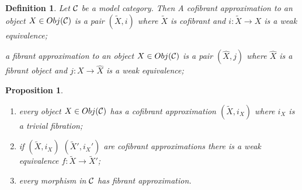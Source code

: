 \documentclass[11pt]{article}
\newtheorem{prop}[thm]{Proposition}
\newtheorem{dfn}[thm]{Definition}
\newcommand{\calc}{{\cal C}}
\newcommand{\lrta}{\longrightarrow}
\begin{document}
\begin{dfn}
Let $\calc$ be a model category. Then A cofibrant approximation to an object $X\in Obj(\calc)$ is a pair $(\tilde{X},i)$ where $\tilde{X}$ is cofibrant and $i:\tilde{X}\lrta X$ is a weak equivalence;

a fibrant approximation to an object $X\in Obj(\calc)$ is a pair $(\hat{X},j)$ where $\hat{X}$ is a fibrant object and $j: X\lrta \hat{X}$ is a weak equivalence;
\end{dfn}

\begin{prop}
\begin{enumerate}[label=(\roman*)]
\item every object $X\in Obj(\calc)$ has a cofibrant approximation $(\tilde{X},i_X)$ where $i_X$ is a trivial fibration;
\item if $(\tilde{X},i_X)$ $(\tilde{X}',i_X
')$ are cofibrant approximations there is a weak equivalence $f:\tilde{X}\lrta \tilde{X}'$;
\item every morphism in $\calc$ has fibrant approximation.
\end{enumerate}
\end{prop}
\end{document}
